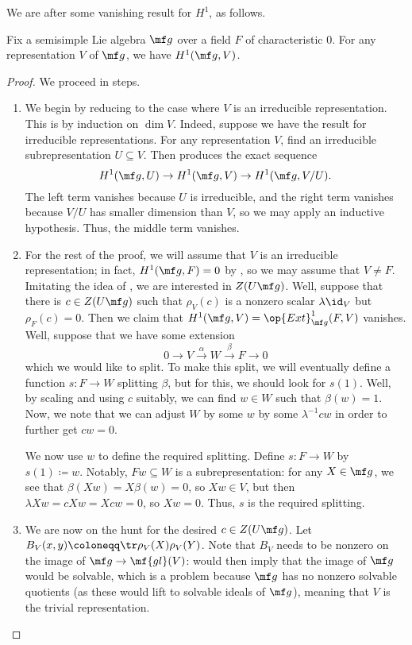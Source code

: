 \documentclass[../notes.tex]{subfiles}
\begin{document}
We are after some vanishing result for $H^1$, as follows.
\begin{theorem} \label{thm:ss-vanishing-h1}
	Fix a semisimple Lie algebra $\mf g$ over a field $F$ of characteristic $0$. For any representation $V$ of $\mf g$, we have $H^1(\mf g,V)$.
\end{theorem}
\begin{proof}
	We proceed in steps.
	\begin{enumerate}
		\item We begin by reducing to the case where $V$ is an irreducible representation. This is by induction on $\dim V$. Indeed, suppose we have the result for irreducible representations. For any representation $V$, find an irreducible subrepresentation $U\subseteq V$. Then  produces the exact sequence
		\[H^1(\mf g,U)\to H^1(\mf g,V)\to H^1(\mf g,V/U).\]
		The left term vanishes because $U$ is irreducible, and the right term vanishes because $V/U$ has smaller dimension than $V$, so we may apply an inductive hypothesis. Thus, the middle term vanishes.

		\item For the rest of the proof, we will assume that $V$ is an irreducible representation; in fact, $H^1(\mf g,F)=0$ by , so we may assume that $V\ne F$. Imitating the idea of , we are interested in $Z(U\mf g)$. Well, suppose that there is $c\in Z(U\mf g)$ such that $\rho_V(c)$ is a nonzero scalar $\lambda\id_V$ but $\rho_F(c)=0$. Then we claim that $H^1(\mf g,V)=\op{Ext}^1_{\mf g}(F,V)$ vanishes. Well, suppose that we have some extension
		\[0\to V\stackrel\alpha\to W\stackrel\beta\to F\to0\]
		which we would like to split. To make this split, we will eventually define a function $s\colon F\to W$ splitting $\beta$, but for this, we should look for $s(1)$. Well, by scaling and using $c$ suitably, we can find $w\in W$ such that $\beta(w)=1$. Now, we note that we can adjust $W$ by some $w$ by some $\lambda^{-1}cw$ in order to further get $cw=0$.

		We now use $w$ to define the required splitting. Define $s\colon F\to W$ by $s(1)\coloneqq w$. Notably, $Fw\subseteq W$ is a subrepresentation: for any $X\in\mf g$, we see that $\beta(Xw)=X\beta(w)=0$, so $Xw\in V$, but then $\lambda Xw=cXw=Xcw=0$, so $Xw=0$. Thus, $s$ is the required splitting.

		\item We are now on the hunt for the desired $c\in Z(U\mf g)$. Let $B_V(x,y)\coloneqq\tr\rho_V(X)\rho_V(Y)$. Note that $B_V$ needs to be nonzero on the image of $\mf g\to\mf{gl}(V)$:  would then imply that the image of $\mf g$ would be solvable, which is a problem because $\mf g$ has no nonzero solvable quotients (as these would lift to solvable ideals of $\mf g$), meaning that $V$ is the trivial representation.


\end{enumerate}
\end{proof}
\end{document}
